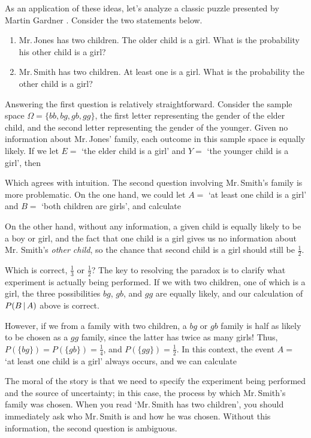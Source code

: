As an application of these ideas, let's analyze a classic puzzle presented by Martin Gardner \cite{TwoChild}. Consider the two statements below.
\vspace*{-4pt}
\begin{enumerate}
\item Mr.\,Jones has two children. The older child is a girl. What is the probability his other child is a girl?
\item Mr.\,Smith has two children. At least one is a girl. What is the probability the other child is a girl?
\end{enumerate}
\par
Answering the first question is relatively straightforward. Consider the sample space $\Omega = \{bb, bg, gb, gg\}$, the first letter representing the gender of the elder child, and the second letter representing the gender of the younger. Given no information about Mr.\,Jones' family, each outcome in this sample space is equally likely. If we let $E =$ `the elder child is a girl' and $Y =$ `the younger child is a girl', then
\par
Which agrees with intuition. The second question involving Mr.\,Smith's family is more problematic. On the one hand, we could let $A =$ `at least one child is a girl' and $B =$ `both children are girls', and calculate
\par
On the other hand, without any information, a given child is equally likely to be a boy or girl, and the fact that one child is a girl gives us no information about Mr. Smith's  \emph{other child}, so the chance that second child is a girl should still be $\frac{1}{2}$.
\par
Which is correct, $\frac{1}{3}$ or $\frac{1}{2}$? The key to resolving the paradox is to clarify what experiment is actually being performed. If we  with two children, one of which is a girl, the three possibilities $bg$, $gb$, and $gg$ are equally likely, and our calculation of $P(B \,|\, A)$ above is correct. 
\par
However, if we  from a family with two children, a $bg$ or $gb$ family is half as likely to be chosen as a $gg$ family, since the latter has twice as many girls! Thus, $P(\{bg\}) = P(\{gb\}) = \frac{1}{4}$, and $P(\{gg\}) = \frac{1}{2}$. In this context, the event $A =$ `at least one child is a girl' always occurs, and we can calculate
\par
The moral of the story is that we need to specify the experiment being performed and the source of uncertainty; in this case, the process by which Mr.\,Smith's family was chosen. When you read `Mr.\,Smith has two children', you should immediately ask who Mr.\,Smith is and how he was chosen. Without this information, the second question is ambiguous.

